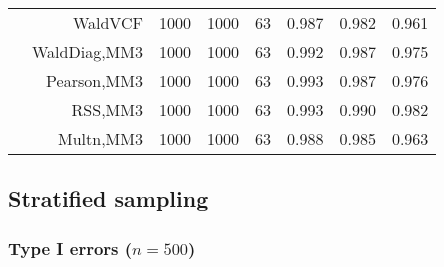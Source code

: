 \documentclass[
]{article}
\begin{document}
\begin{table}[H]
{\begin{tabular}[t]{lrrrrrrr}
\hspace{1em} & WaldVCF & 1000 & 1000 & 63 & 0.987 & 0.982 & 0.961\\

\hspace{1em} & WaldDiag,MM3 & 1000 & 1000 & 63 & 0.992 & 0.987 & 0.975\\

\hspace{1em} & Pearson,MM3 & 1000 & 1000 & 63 & 0.993 & 0.987 & 0.976\\

\hspace{1em} & RSS,MM3 & 1000 & 1000 & 63 & 0.993 & 0.990 & 0.982\\

\hspace{1em} & Multn,MM3 & 1000 & 1000 & 63 & 0.988 & 0.985 & 0.963\\
\bottomrule
\end{tabular}}
\endgroup{}
\end{table}

\hypertarget{stratified-sampling}{%
\subsection{Stratified sampling}\label{stratified-sampling}}

\hypertarget{type-i-errors-n500-1}{%
\subsubsection{\texorpdfstring{Type I errors
(\(n=500\))}{Type I errors (n=500)}}\label{type-i-errors-n500-1}}
\end{document}
